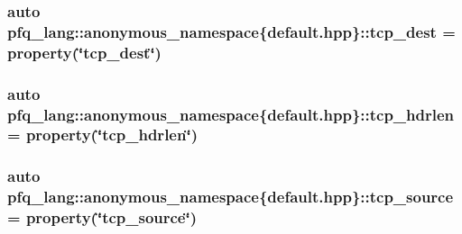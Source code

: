 \hypertarget{namespacepfq__lang_1_1anonymous__namespace_02default_8hpp_03_a3123415d88452c599055bf8eaba2211e}{
\subsubsection[{tcp\-\_\-dest}]{\setlength{\rightskip}{0pt plus 5cm}auto pfq\-\_\-lang\-::anonymous\-\_\-namespace\{default.\-hpp\}\-::tcp\-\_\-dest = {\bf property}(\char`\"{}tcp\-\_\-dest\char`\"{})}}\label{namespacepfq__lang_1_1anonymous__namespace_02default_8hpp_03_a3123415d88452c599055bf8eaba2211e}
\hypertarget{namespacepfq__lang_1_1anonymous__namespace_02default_8hpp_03_aa8e6b2154ad12220fd1f348c37eaa621}{
\subsubsection[{tcp\-\_\-hdrlen}]{\setlength{\rightskip}{0pt plus 5cm}auto pfq\-\_\-lang\-::anonymous\-\_\-namespace\{default.\-hpp\}\-::tcp\-\_\-hdrlen = {\bf property}(\char`\"{}tcp\-\_\-hdrlen\char`\"{})}}\label{namespacepfq__lang_1_1anonymous__namespace_02default_8hpp_03_aa8e6b2154ad12220fd1f348c37eaa621}
\hypertarget{namespacepfq__lang_1_1anonymous__namespace_02default_8hpp_03_a4b3ea94407fb5f52e5dfd9e2511f04a8}{
\subsubsection[{tcp\-\_\-source}]{\setlength{\rightskip}{0pt plus 5cm}auto pfq\-\_\-lang\-::anonymous\-\_\-namespace\{default.\-hpp\}\-::tcp\-\_\-source = {\bf property}(\char`\"{}tcp\-\_\-source\char`\"{})}}\label{namespacepfq__lang_1_1anonymous__namespace_02default_8hpp_03_a4b3ea94407fb5f52e5dfd9e2511f04a8}
